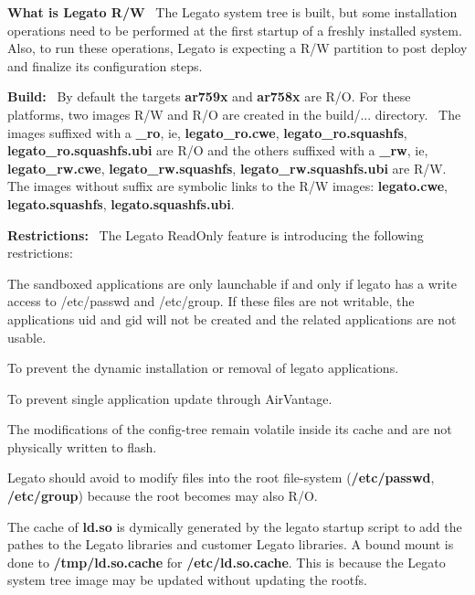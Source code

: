 {\bfseries What is Legato R/W}~\newline
 The Legato system tree is built, but some installation operations need to be performed at the first startup of a freshly installed system. Also, to run these operations, Legato is expecting a R/W partition to post deploy and finalize its configuration steps.

{\bfseries Build\+:}~\newline
 By default the targets {\bfseries ar759x} and {\bfseries ar758x} are R/O. For these platforms, two images R/W and R/O are created in the build/... directory.~\newline
 The images suffixed with a {\bfseries \+\_\+ro}, ie, {\bfseries legato\+\_\+ro.\+cwe}, {\bfseries legato\+\_\+ro.\+squashfs}, {\bfseries legato\+\_\+ro.\+squashfs.\+ubi} are R/O and the others suffixed with a {\bfseries \+\_\+rw}, ie, {\bfseries legato\+\_\+rw.\+cwe}, {\bfseries legato\+\_\+rw.\+squashfs}, {\bfseries legato\+\_\+rw.\+squashfs.\+ubi} are R/W. The images without suffix are symbolic links to the R/W images\+: {\bfseries legato.\+cwe}, {\bfseries legato.\+squashfs}, {\bfseries legato.\+squashfs.\+ubi}.

{\bfseries Restrictions\+:}~\newline
 The Legato Read\+Only feature is introducing the following restrictions\+:
\begin{DoxyItemize}
\item The sandboxed applications are only launchable if and only if legato has a write access to /etc/passwd and /etc/group. If these files are not writable, the applications uid and gid will not be created and the related applications are not usable.
\item To prevent the dynamic installation or removal of legato applications.
\item To prevent single application update through Air\+Vantage.
\item The modifications of the config-\/tree remain volatile inside its cache and are not physically written to flash.
\item Legato should avoid to modify files into the root file-\/system ({\bfseries {\ttfamily /etc/passwd}}, {\bfseries {\ttfamily /etc/group}}) because the root becomes may also R/O.
\item The cache of {\bfseries {\ttfamily ld.\+so}} is dymically generated by the legato startup script to add the pathes to the Legato libraries and customer Legato libraries. A bound mount is done to {\bfseries {\ttfamily /tmp/ld.so.\+cache}} for {\bfseries {\ttfamily /etc/ld.so.\+cache}}. This is because the Legato system tree image may be updated without updating the rootfs.
\end{DoxyItemize}

